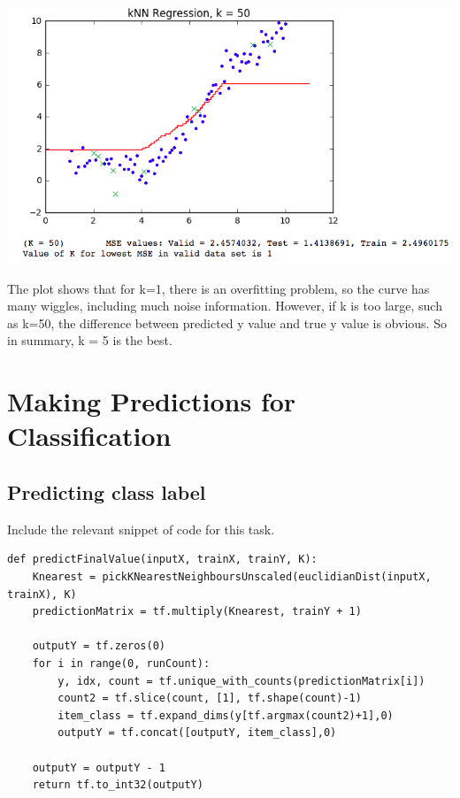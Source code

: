 \documentclass{article}
\begin{document}
\begin{center}
\includegraphics[scale=0.6]{4.png}
\end{center}


The plot shows that for k=1, there is an overfitting problem, so the curve has many wiggles, including much noise information. However, if k is too large, such as k=50, the difference between predicted y value and true y value is obvious. So in summary, k = 5 is the best.


\section{Making Predictions for Classification}
\subsection{Predicting class label}
Include the relevant snippet of code for this task.

\begin{verbatim}
def predictFinalValue(inputX, trainX, trainY, K):
    Knearest = pickKNearestNeighboursUnscaled(euclidianDist(inputX, trainX), K)
    predictionMatrix = tf.multiply(Knearest, trainY + 1)

    outputY = tf.zeros(0)    
    for i in range(0, runCount):
        y, idx, count = tf.unique_with_counts(predictionMatrix[i])
        count2 = tf.slice(count, [1], tf.shape(count)-1)
        item_class = tf.expand_dims(y[tf.argmax(count2)+1],0)
        outputY = tf.concat([outputY, item_class],0)
    
    outputY = outputY - 1
    return tf.to_int32(outputY)
\end{verbatim}
\end{document}
